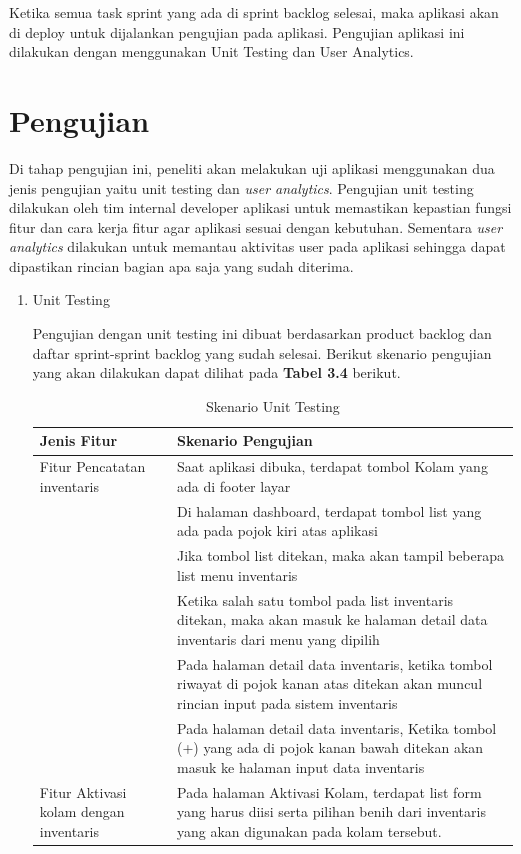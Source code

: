 \begin{spacing}{1.5}
\begin{enumerate}
	Ketika semua task sprint yang ada di sprint backlog selesai, maka aplikasi akan di deploy untuk dijalankan pengujian pada aplikasi. Pengujian aplikasi ini dilakukan dengan menggunakan Unit Testing dan User Analytics.
	
\end{enumerate}

\section{Pengujian}

Di tahap pengujian ini, peneliti akan melakukan uji aplikasi menggunakan dua jenis pengujian yaitu unit testing dan \textit{user analytics}. Pengujian unit testing dilakukan oleh tim internal developer aplikasi untuk memastikan kepastian fungsi fitur dan cara kerja fitur agar aplikasi sesuai dengan kebutuhan. Sementara \textit{user analytics} dilakukan untuk memantau aktivitas user pada aplikasi sehingga dapat dipastikan rincian bagian apa saja yang sudah diterima.

\begin{enumerate}
	\item Unit Testing
	
	Pengujian dengan unit testing ini dibuat berdasarkan product backlog dan daftar sprint-sprint backlog yang sudah selesai. Berikut skenario pengujian yang akan dilakukan dapat dilihat pada \textbf{Tabel 3.4} berikut.

	\begin{table}[H]	
		\begin{center}
			\caption{Skenario Unit Testing}
			\label{tab:table8}
			\begin{tabular}{|m{13em}|m{17em}|}
			\hline
			\textbf{Jenis Fitur} & \textbf{Skenario Pengujian} \\
			\hline
			Fitur Pencatatan inventaris & Saat aplikasi dibuka, terdapat tombol Kolam yang ada di footer layar \\
			\hline
			 & Di halaman dashboard, terdapat tombol list yang ada pada pojok kiri atas aplikasi \\
			\hline
			 & Jika tombol list ditekan, maka akan tampil beberapa list menu inventaris \\
			\hline
			& Ketika salah satu tombol pada list inventaris ditekan, maka akan masuk ke halaman detail data inventaris dari menu yang dipilih \\
			\hline
			& Pada halaman detail data inventaris, ketika tombol riwayat di pojok kanan atas ditekan akan muncul rincian input pada sistem inventaris \\
			\hline
			& Pada halaman detail data inventaris, Ketika tombol (+) yang ada di pojok kanan bawah ditekan akan masuk ke halaman input data inventaris \\
			\hline
			Fitur Aktivasi kolam dengan inventaris & Pada halaman Aktivasi Kolam, terdapat list form yang harus diisi serta pilihan benih dari inventaris yang akan digunakan pada kolam tersebut.\\
			\hline
			\end{tabular}
		\end{center}
	\end{table}


\end{enumerate}
\end{spacing}

